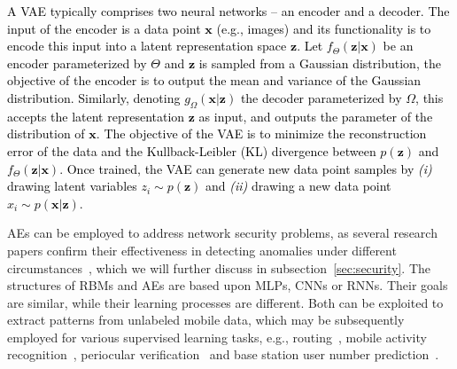 \documentclass[journal,comsoc,letter]{IEEEtran}
\newcommand{\edit}[1]{\textcolor{black}{#1}}
\begin{document}
\edit{
A VAE typically comprises two neural networks -- an encoder and a decoder. The input of the encoder is a data point $\mathbf{x}$ (e.g., images) and its functionality is to encode this input into a latent representation space $\mathbf{z}$. Let $f_\Theta(\mathbf{z}|\mathbf{x})$ be an encoder parameterized by $\Theta$ and $\mathbf{z}$ is sampled from a Gaussian distribution, the objective of the encoder is to output the mean and variance of the Gaussian distribution.}
\edit{
Similarly, denoting $g_\Omega(\mathbf{x}|\mathbf{z})$ the decoder parameterized by $\Omega$, this accepts the latent representation $\mathbf{z}$ as input, and outputs the parameter of the distribution of $\mathbf{x}$. The objective of the VAE is to minimize the reconstruction error of the data and the  Kullback-Leibler (KL) divergence between $p(\mathbf{z})$ and $f_\Theta(\mathbf{z}|\mathbf{x})$. Once trained, the VAE can generate new data point samples by \emph{(i)} drawing latent variables $z_i \sim p(\mathbf{z})$ and \emph{(ii)} drawing a new data point $x_i \sim p(\mathbf{x}\vert \mathbf{z})$.}

AEs can be employed to address network security problems, as several research papers confirm their effectiveness in detecting anomalies under different circumstances~\cite{sakurada2014anomaly, nicolau2016hybrid, thing2017ieee}, which we will further discuss in subsection~\ref{sec:security}.
The structures of RBMs and AEs are based upon MLPs, CNNs or RNNs. Their goals are similar, while their learning processes are different. Both  can be exploited to extract patterns from unlabeled mobile data, which may be subsequently employed for various supervised learning tasks, e.g., routing~\cite{mao2017routing}, mobile activity recognition~\cite{radu2016towards, radu2018multimodal}, periocular verification~\cite{raghavendra2016learning} and base station user number prediction~\cite{li2016wavelet}.
\end{document}
